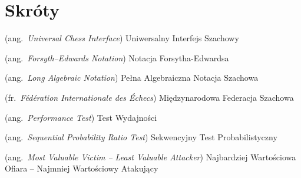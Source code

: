 %
\chapter*{Skróty}
\label{sec:skroty}
\noindent\vspace{-\topsep-\partopsep-\parsep} %
\begin{description}[labelwidth=*]
  \item [UCI] (ang.\ \emph{Universal Chess Interface}) Uniwersalny Interfejs Szachowy
  \item [FEN] (ang.\ \emph{Forsyth–Edwards Notation}) Notacja Forsytha-Edwardsa
  \item [LAN] (ang.\ \emph{Long Algebraic Notation}) Pełna Algebraiczna Notacja Szachowa
  \item [FIDE] (fr.\ \emph{Fédération Internationale des Échecs}) Międzynarodowa Federacja Szachowa
  \item [Perft] (ang.\ \emph{Performance Test}) Test Wydajności
  \item [SPRT] (ang.\ \emph{Sequential Probability Ratio Test}) Sekwencyjny Test Probabilistyczny
  \item [MVV-LVA] (ang.\ \emph{Most Valuable Victim – Least Valuable Attacker}) Najbardziej Wartościowa Ofiara – Najmniej Wartościowy Atakujący
\end{description}


